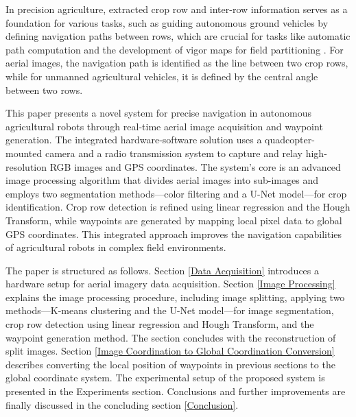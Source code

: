 \documentclass[conference]{IEEEtran}
\begin{document}
In precision agriculture, extracted crop row and inter-row information serves as a foundation for various tasks, such as guiding autonomous ground vehicles by defining navigation paths between rows, which are crucial for tasks like automatic path computation and the development of vigor maps for field partitioning \cite{b11}. For aerial images, the navigation path is identified as the line between two crop rows, while for unmanned agricultural vehicles, it is defined by the central angle between two rows\cite{b1}.


This paper presents a novel system for precise navigation in autonomous agricultural robots through real-time aerial image acquisition and waypoint generation. The integrated hardware-software solution uses a quadcopter-mounted camera and a radio transmission system to capture and relay high-resolution RGB images and GPS coordinates. The system's core is an advanced image processing algorithm that divides aerial images into sub-images and employs two segmentation methods—color filtering and a U-Net model—for crop identification. Crop row detection is refined using linear regression and the Hough Transform, while waypoints are generated by mapping local pixel data to global GPS coordinates. This integrated approach improves the navigation capabilities of agricultural robots in complex field environments.

The paper is structured as follows. Section \ref{Data Acquisition} introduces a hardware setup for aerial imagery data acquisition. Section \ref{Image Processing} explains the image processing procedure, including image splitting, applying two methods—K-means clustering and the U-Net model—for image segmentation, crop row detection using linear regression and Hough Transform, and the waypoint generation method. The section concludes with the reconstruction of split images. Section \ref{Image Coordination to Global Coordination Conversion} describes converting the local position of waypoints in previous sections to the global coordinate system. The experimental setup of the proposed system is presented in the Experiments section. Conclusions and further improvements are finally discussed in the concluding section
\ref{Conclusion}.
\end{document}
